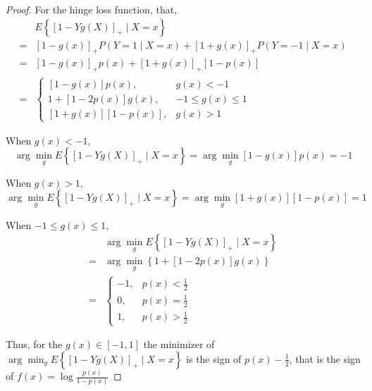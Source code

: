 \begin{proof}
    For the hinge loss function, that,
    \begin{equation*}
        \begin{aligned}
              & E\left\{\left[1-Yg(X)\right]_{+}\mid X=x\right\}                                                   \\
            = & \left[1-g(x)\right]_{+}P\left(Y=1\mid X=x\right)+\left[1+g(x)\right]_{+}P\left(Y=-1\mid X=x\right) \\
            = & \left[1-g(x)\right]_{+}p(x)+\left[1+g(x)\right]_{+}\left[1-p(x)\right]                             \\
            = & \left\{\begin{array}{ll}
                \left[1-g(x)\right]p(x),                & g(x)<-1           \\
                1+\left[1-2p(x)\right]g(x),             & -1\leq g(x)\leq 1 \\
                \left[1+g(x)\right]\left[1-p(x)\right], & g(x)>1
            \end{array}\right.
        \end{aligned}
    \end{equation*}

    When $g(x)<-1$,
    \begin{equation*}
        \arg\min_{g}E\left\{\left[1-Yg(X)\right]_{+}\mid X=x\right\}=\arg\min_{g}\left[1-g(x)\right]p(x)=-1
    \end{equation*}

    When $g(x)>1$,
    \begin{equation*}
        \arg\min_{g}E\left\{\left[1-Yg(X)\right]_{+}\mid X=x\right\}=\arg\min_{g}\left[1+g(x)\right]\left[1-p(x)\right]=1
    \end{equation*}

    When $-1\leq g(x)\leq 1$,
    \begin{equation*}
        \begin{aligned}
              & \arg\min_{g}E\left\{\left[1-Yg(X)\right]_{+}\mid X=x\right\} \\
            = & \arg\min_{g}\left\{1+\left[1-2p(x)\right]g(x)\right\}        \\
            = & \left\{\begin{array}{ll}
                -1, & p(x)<\frac{1}{2} \\
                0,  & p(x)=\frac{1}{2} \\
                1,  & p(x)>\frac{1}{2}
            \end{array}\right.
        \end{aligned}
    \end{equation*}

    Thus, for the $g(x)\in\left[-1,1\right]$ the minimizer of $\arg\min_{g} E\left\{\left[1-Yg(X)\right]_{+}\mid X=x\right\}$ is the sign of $p(x)-\frac{1}{2}$, that is the sign of $f(x)=\log\frac{p(x)}{1-p(x)}$
\end{proof}